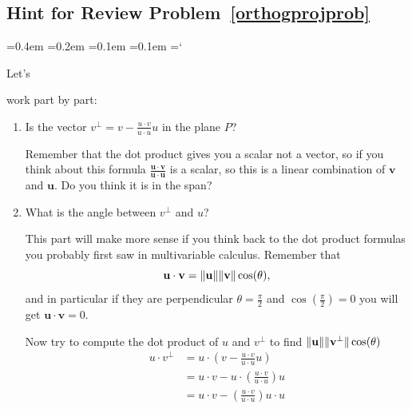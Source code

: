 
\subsection*{Hint  for Review Problem~\ref{orthogprojprob}}

{\ttfamily
{}\font=0.4em
\font=0.2em
\font=0.1em
\font=0.1em
\hyphenchar\font=`\-


\hypertarget{scripts_orthonormal_bases_hint3}{Let's} 
work part by part:
\begin{enumerate}\renewcommand{\theenumi}{(\alph*{enumi})}
\item Is the vector $v^\bot = v-\frac{u\cdot v}{u\cdot u}u$ in the plane $P$? 

Remember that the dot product gives you a scalar not a vector, so if you think about this formula $\frac{\mathbf{u}\cdot \mathbf{v}}{\mathbf{u}\cdot \mathbf{u}}$ is a scalar, so this is a linear combination of $\mathbf{v}$ and $\mathbf{u}$. Do you think it is in the span?

\item What is the angle between $v^\bot$ and $u$?

This part will make more sense if you think back to the dot product formulas you probably first saw in multivariable calculus. Remember that 
\[\mathbf{u}\cdot \mathbf{v} = \|\mathbf{u}\| \|\mathbf{v}\| \cos(\theta),
\] 
and in particular if they are perpendicular $\theta = \frac{\pi}{2}$ and $\cos(\frac{\pi}{2}) = 0$ you will get $\mathbf{u}\cdot \mathbf{v} = 0$.

Now try to compute the dot product of $u$ and $v^\bot$ to find $ \|\mathbf{u}\| \|\mathbf{v^\bot}\| \cos(\theta)$
\begin{align*}
u\cdot v^\bot &= u\cdot \left( v  -  \frac{u\cdot v}{u\cdot u}u \right) \\
&= u\cdot  v  - u\cdot \left( \frac{u\cdot v}{u\cdot u} \right)u \\
&= u\cdot  v  - \left( \frac{u\cdot v}{u\cdot u} \right) u\cdot u
\end{align*}


\end{enumerate}}
